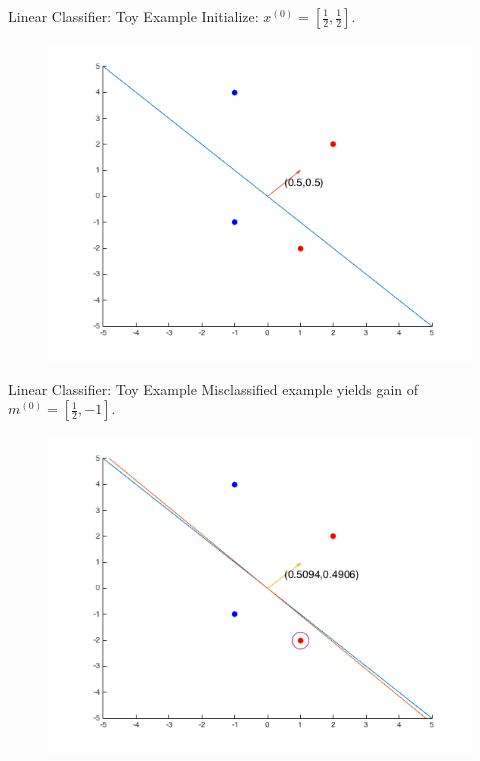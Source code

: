 \documentclass{beamer}
\begin{document}
\begin{frame}{Linear Classifier: Toy Example}
Initialize: $x^{(0)} = [\frac{1}{2}, \frac{1}{2}]$.
\begin{figure}
\includegraphics[width=\textwidth]{ClassifierToy_x0.png}
\end{figure}
\end{frame}

\begin{frame}{Linear Classifier: Toy Example}
Misclassified example yields gain of $m^{(0)} = [\frac{1}{2},-1]$.
\begin{figure}
\includegraphics[width=\textwidth]{ClassifierToy_x1.png}
\end{figure}
\end{frame}
\end{document}
